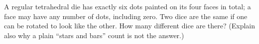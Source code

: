 A regular tetrahedral die has exactly six dots painted on its four faces in total; a face may have any number of dots, including zero. Two dice are the same if one can be rotated to look like the other. How many different dice are there? (Explain also why a plain ``stars and bars'' count is not the answer.)
